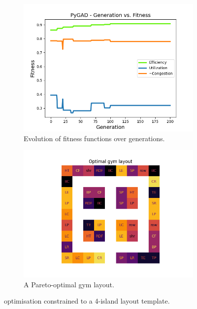 \documentclass[9pt]{pnas-new}
\begin{document}
\begin{figure}[H]
	\begin{subfigure}{0.495\linewidth}
        \centering
        \includegraphics[width=\textwidth]{2x2fitness.png}
        \caption{Evolution of fitness functions over generations.}\label{fig:2x2fitness}
    \end{subfigure}
    \begin{subfigure}{0.495\linewidth}
        \centering
        \includegraphics[width=\textwidth]{2x2_layout.png}
        \caption{A Pareto-optimal gym layout.}\label{fig:2x2_layout}
    \end{subfigure}
    \caption{optimisation constrained to a 4-island layout template.}\label{fig:secondTest}
\end{figure}
\end{document}
